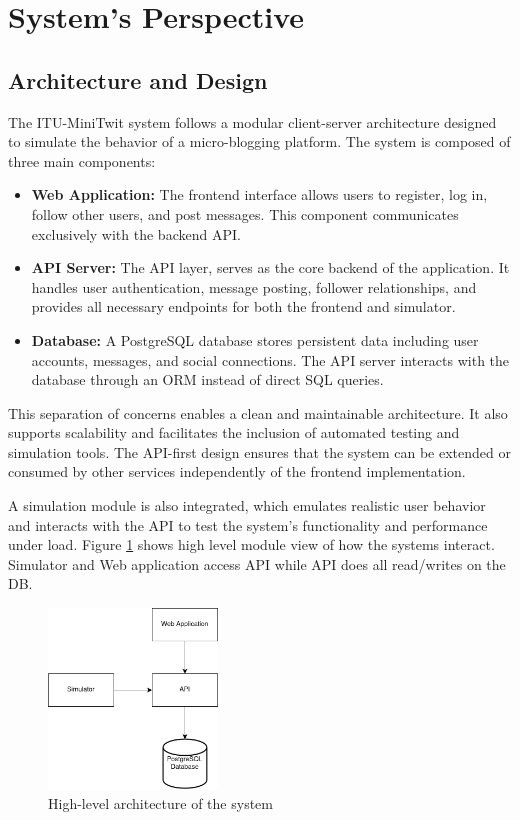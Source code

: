 \section{System's Perspective}

\subsection{Architecture and Design}
The ITU-MiniTwit system follows a modular client-server architecture designed to simulate the behavior of a micro-blogging platform. The system is composed of three main components:

\begin{itemize}
  \item \textbf{Web Application:} The frontend interface allows users to register, log in, follow other users, and post messages. This component communicates exclusively with the backend API.
  
  \item \textbf{API Server:} The API layer, serves as the core backend of the application. It handles user authentication, message posting, follower relationships, and provides all necessary endpoints for both the frontend and simulator.
  
  \item \textbf{Database:} A PostgreSQL database stores persistent data including user accounts, messages, and social connections. The API server interacts with the database through an ORM instead of direct SQL queries.
\end{itemize}

This separation of concerns enables a clean and maintainable architecture. It also supports scalability and facilitates the inclusion of automated testing and simulation tools. The API-first design ensures that the system can be extended or consumed by other services independently of the frontend implementation.

A simulation module is also integrated, which emulates realistic user behavior and interacts with the API to test the system's functionality and performance under load. Figure \ref{fig:simple-architecture} shows high level module view of how the systems interact. Simulator and Web application access API while API does all read/writes on the DB. 

\begin{figure}[H]
  \centering
  \includegraphics[width=0.4\textwidth]{images/simple-arch.png}
  \caption{High-level architecture of the system}
  \label{fig:simple-architecture}
\end{figure}

